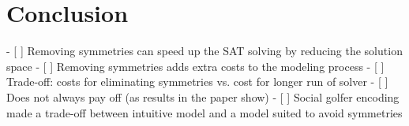 \documentclass[a4paper]{scrartcl}
\begin{document}
\section{Conclusion}

- [ ] Removing symmetries can speed up the SAT solving by reducing the
      solution space
- [ ] Removing symmetries adds extra costs to the modeling process
    - [ ] Trade-off: costs for eliminating symmetries vs. cost for
          longer run of solver
    - [ ] Does not always pay off (as results in the paper show)
- [ ] Social golfer encoding made a trade-off between intuitive model
      and a model suited to avoid symmetries
\end{document}
